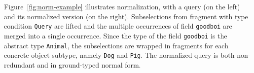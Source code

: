 
\iffalse
\td{This is the same example as above, so it can be reused}
\begin{verbatim}
// Not grounded query
query {
    goodboi {
        name
    }
}
// Normalized query
query {
    goodboi {
        |$\ldots$| on Dog {
	    name
	}
	|$\ldots$| on Pig {
	    name
	}
    }	
}
\end{verbatim} 
\fi



Figure~\ref{fig:norm-example} illustrates normalization, with a query (on the left) and its normalized version (on the right). Subselections from fragment with type condition \texttt{Query} are lifted and the multiple occurrences of field \texttt{goodboi} are merged into a single occurrence. 
Since the type of the field \texttt{goodboi} is the abstract type \texttt{Animal}, the subselections are wrapped in fragments for each concrete object subtype, namely \texttt{Dog} and \texttt{Pig}. The normalized query is both non-redundant and in ground-typed normal form. 



